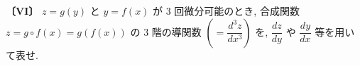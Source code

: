 \noindent\textbf{〔VI〕}
$z=g(y)$ と $y=f(x)$ が 3 回微分可能のとき, 合成関数
$z=g\circ f(x)=g(f(x))$ の 3 階の導関数
$\left(=\dfrac{d^3 z}{dx^3}\right)$ を,
$\dfrac{dz}{dy}$ や $\dfrac{dy}{dx}$ 等を用いて表せ.
